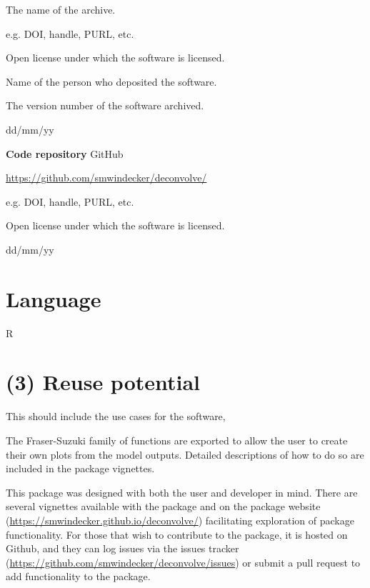 \documentclass{jors}\usepackage[]{graphicx}\usepackage[]{color}
\begin{document}
\begin{description}[noitemsep,topsep=0pt]
	\item[Name:] The name of the archive.
	\item[Persistent identifier:] e.g. DOI, handle, PURL, etc.
	\item[Licence:] Open license under which the software is licensed.
	\item[Publisher:] Name of the person who deposited the software.
	\item[Version published:] The version number of the software archived.
	\item[Date published:] dd/mm/yy
\end{description}


{\bf Code repository} GitHub

\begin{description}[noitemsep,topsep=0pt]
	\item[Name:] \url{https://github.com/smwindecker/deconvolve/}
	\item[Persistent identifier:] e.g. DOI, handle, PURL, etc.
	\item[Licence:] Open license under which the software is licensed.
	\item[Date published:] dd/mm/yy
\end{description}

\section*{Language}
R

\section*{(3) Reuse potential}
This should include the use cases for the software,

The Fraser-Suzuki family of functions are exported to allow the user to create their own plots from the model outputs. Detailed descriptions of how to do so are included in the package vignettes.

This package was designed with both the user and developer in mind. There are several vignettes available with the package and on the package website (\url{https://smwindecker.github.io/deconvolve/}) facilitating exploration of package functionality. For those that wish to contribute to the package, it is hosted on Github, and they can log issues via the issues tracker (\url{https://github.com/smwindecker/deconvolve/issues}) or submit a pull request to add functionality to the package.
\end{document}
